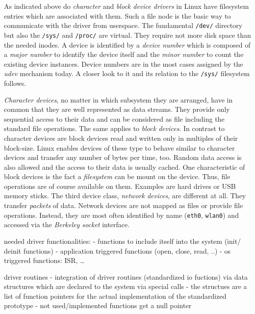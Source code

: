 As indicated above do \textit{character} and \textit{block device drivers} in Linux have filesystem entries which are associated with them.
Such a file node is the basic way to communicate with the driver from userspace.
The fundamental \texttt{/dev/} directory but also the \texttt{/sys/} and \texttt{/proc/} are virtual.
They require not more disk space than the needed inodes.
A device is identified by a \textit{device number} which is composed of a \textit{major number} to identify the device itself and the \textit{minor number} to count the existing device instances\cite{lfd430}.
Device numbers are in the most cases assigned by the \textit{udev} mechanism today.
A closer look to it and its relation to the \texttt{/sys/} filesystem follows.

\textit{Character devices}, no matter in which subsystem they are arranged, have in common that they are well represented as data streams.
They provide only sequential access to their data and can be considered as file including the standard file operations\cite{lfd430}.
The same applies to \textit{block devices}.
In contrast to character devices are block devices read and written only in multiples of their block-size.
Linux enables devices of these type to behave similar to character devices and transfer any number of bytes per time, too\cite{lfd430}.
Random data access is also allowed and the access to their data is usually cached.
One characteristic of block devices is the fact a \textit{filesystem} can be mount on the device.
Thus, file operations are of course available on them.
Examples are hard drives or USB memory sticks\cite{lfd430}.
The third device class, \textit{network devices}, are different at all.
They transfer \textit{packets} of data.
Network devices are not mapped as files or provide file operations.
Instead, they are most often identified by name (\texttt{eth0}, \texttt{wlan0}) and accessed via the \textit{Berkeley socket} interface\cite{lfd430}.




\cite{quade2016Linux}
needed driver functionalities: 
- functions to include itself into the system (init/ deinit functions)
- application triggered functions (open, close, read, ..)
- os triggered functions: ISR, \ldots


driver routines
- integration of driver routines  (standardized io fuctions) via data structures which are declared to the system via special calls
- the structues are a list of function pointers for the actual implementation of the standardized prototype
- not used/implemented functions get a null pointer

